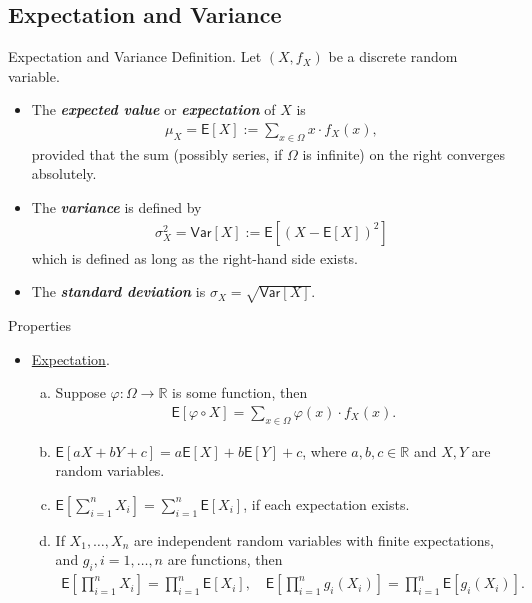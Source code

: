 \documentclass[hyperref={pdfpagelabels=false}]{beamer}
\newcommand{\R}{\mathbb{R}}
\newcommand{\U}{\mathsf}
\newcommand{\highlightg}[1]{\textcolor[rgb]{0.1,0.5,0.3}{\emph{\textbf{#1}}}}
\newcommand{\structb}[1]{\textcolor[rgb]{0.2,0.2,0.7}{#1}}
\begin{document}
\subsection{Expectation and Variance}
%
\begin{frame}{Expectation and Variance}
    \structb{Definition.} Let $(X, f_X)$ be a discrete random variable.
    \begin{itemize}
    	\justifying
    	\item The \highlightg{expected value} or \highlightg{expectation} of $X$ is 
    	\begin{align*}
    	    \mu_X = \U{E}[X] := \sum_{x\in \Omega} x\cdot f_X(x),
    	\end{align*}
    	provided that the sum (possibly series, if $\Omega$ is infinite) on the right converges absolutely.
    	\item The \highlightg{variance} is defined by
    	\begin{align*}
    	    \sigma_X^2 = \U{Var}[X] := \U{E}\left[(X - \U{E}[X])^2 \right]
    	\end{align*}
    	which is defined as long as the right-hand side exists.
    	\item The \highlightg{standard deviation} is $\sigma_X = \sqrt{\U{Var}[X]}$.
    \end{itemize}
\end{frame}
%
\begin{frame}{Properties}
    \begin{itemize}
    	\justifying
    	\item \underline{Expectation}.
    	\justifying
    	\begin{enumerate}[(a).]
    		\justifying
    		\item Suppose $\varphi: \Omega \rightarrow \R$ is some function, then
    		\begin{align*}
    		    \U{E}[\varphi\circ X] = \displaystyle \sum_{x\in \Omega} \varphi(x) \cdot f_X(x).
    		\end{align*}
    		\item $\U{E}[aX + bY + c] = a\U{E}[X] + b\U{E}[Y] + c$, where $a, b, c\in \R$ and $X, Y$ are random variables.
    		\item $\displaystyle\U{E}\left[\sum_{i=1}^n X_i \right]  = \sum_{i=1}^n \U{E}[X_i]$, if each expectation exists.
    		\item If $X_1, \ldots, X_n$ are independent random variables with finite expectations, and $g_i, i = 1, \ldots, n$ are functions, then 
    		\begin{align*}
    		    \U{E}\left[\prod_{i=1}^n X_i \right] = \prod_{i=1}^n \U{E}[X_i], \quad \U{E}\left[\prod_{i=1}^n g_i(X_i) \right] = \prod_{i=1}^n \U{E}[g_i(X_i)].
    		\end{align*}
    	\end{enumerate}
    \end{itemize}
\end{frame}
\end{document}
